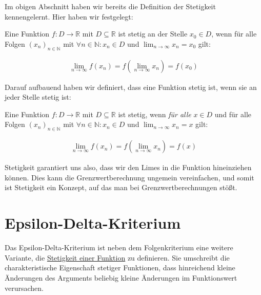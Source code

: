 \documentclass[fontsize=9pt,
               parskip=half-,
               DIV=14,
               listof=chapterentry,
               tocflat]{scrbook}
\begin{document}
Im obigen Abschnitt haben wir bereits die Definition der Stetigkeit kennengelernt. Hier haben wir festgelegt:



\begin{definition*}
Eine Funktion $f:D\to \mathbb {R} $ mit $D\subseteq \mathbb {R} $ ist stetig an der Stelle $x_{0}\in D$, wenn für alle Folgen $(x_{n})_{n\in \mathbb {N} }$ mit $\forall n\in \mathbb {N} :x_{n}\in D$ und $\lim _{n\to \infty }x_{n}=x_{0}$ gilt:

\begin{align*}
\lim _{n\to \infty }f(x_{n})=f\left(\lim _{n\to \infty }x_{n}\right)=f(x_{0})
\end{align*}

\end{definition*}



Darauf aufbauend haben wir definiert, dass eine Funktion stetig ist, wenn sie an jeder Stelle stetig ist:



\begin{definition*}
Eine Funktion $f:D\to \mathbb {R} $ mit $D\subseteq \mathbb {R} $ ist stetig, wenn \emph{für alle} $x\in D$ und für alle Folgen $(x_{n})_{n\in \mathbb {N} }$ mit $\forall n\in \mathbb {N} :x_{n}\in D$ und $\lim _{n\to \infty }x_{n}=x$ gilt:

\begin{align*}
\lim _{n\to \infty }f(x_{n})=f\left(\lim _{n\to \infty }x_{n}\right)=f(x)
\end{align*}

\end{definition*}



Stetigkeit garantiert uns also, dass wir den Limes in die Funktion hineinziehen können. Dies kann die Grenzwertberechnung ungemein vereinfachen, und somit ist Stetigkeit ein Konzept, auf das man bei Grenzwertberechnungen stößt.

\chapter{Epsilon-Delta-Kriterium}

Das Epsilon-Delta-Kriterium ist neben dem Folgenkriterium eine weitere Variante, die \href{https://de.wikibooks.org/wiki/Mathe\_für\_Nicht-Freaks:\_Stetigkeit\_von\_Funktionen}
{Stetigkeit einer Funktion} zu definieren. Sie umschreibt die charakteristische Eigenschaft stetiger Funktionen, dass hinreichend kleine Änderungen des Arguments beliebig kleine Änderungen im Funktionswert verursachen.
\end{document}
